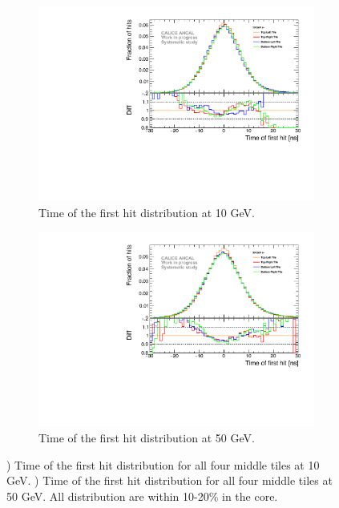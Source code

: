 \begin{figure}[htbp!]
	\begin{subfigure}[t]{0.45\textwidth}
		\centering
		\includegraphics[width=1\textwidth]{chap5/fig_AHCAL_timing/Electrons/Systematic_Inhomogeneity_10GeV.pdf}
		\caption{Time of the first hit distribution at 10 GeV.}\label{fig:timing_inhomo_10GeV}
	\end{subfigure}
	\hfill
	\begin{subfigure}[t]{0.45\textwidth}
		\centering
		\includegraphics[width=1\textwidth]{chap5/fig_AHCAL_timing/Electrons/Systematic_Inhomogeneity_50GeV.pdf}
		\caption{Time of the first hit distribution at 50 GeV.}\label{fig:timing_inhomo_50GeV}
	\end{subfigure}
	\caption{) Time of the first hit distribution for all four middle tiles at 10 GeV. ) Time of the first hit distribution for all four middle tiles at 50 GeV. All distribution are within 10-20\% in the core.}
\end{figure}

